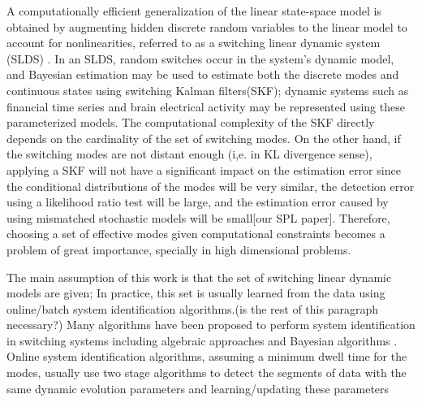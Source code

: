 \documentclass[journal]{IEEEtran}
\begin{document}
A computationally efficient generalization of the linear state-space model is obtained by augmenting hidden discrete random variables to the linear model to account for nonlinearities, referred to as a switching linear dynamic system (SLDS) \cite{dbn}. In an SLDS, random switches occur in the system’s dynamic model, and Bayesian estimation may be used to estimate both the discrete modes and continuous states using switching Kalman filters(SKF)\cite{skf,skf2,skf3}; dynamic systems such as financial time series and brain electrical activity may be represented using these parameterized models\cite{fin,eeg}. The computational complexity of the SKF directly depends on the cardinality of the set of switching modes\cite{skf3}. On the other hand, if the switching modes are not distant enough (i,e. in KL divergence sense), applying a SKF will not have a significant impact on the estimation error since the conditional distributions of the modes will be very similar, the detection error using a likelihood ratio test will be large, and the estimation error caused by using mismatched stochastic models will be small[our SPL paper]. Therefore, choosing a set of effective modes given computational constraints becomes a problem of great importance, specially in high dimensional problems.



The main assumption of this work is that the set of switching linear dynamic models are given; In practice, this set is usually learned from the data using online/batch system identification algorithms.(is the rest of this paragraph necessary?) Many algorithms have been proposed to perform system identification in switching systems including algebraic approaches \cite{si_alg,si-alg2,sis-alg3} and Bayesian algorithms \cite{si-bay,hdp}. Online system identification algorithms, assuming a minimum dwell time for the modes, usually use two stage algorithms to detect the segments of data with the same dynamic evolution parameters and learning/updating these parameters \cite{sis-on1,sis-on2,sis-on3}
\end{document}

